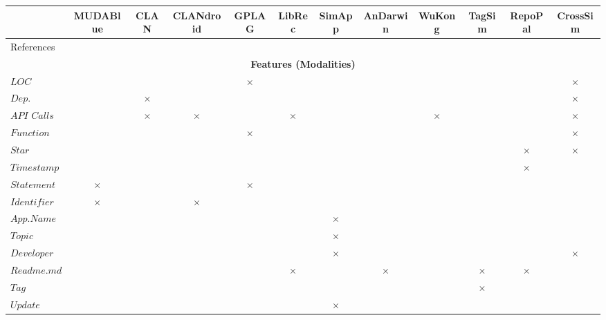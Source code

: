 \begin{landscape}
	\begin{table}[htbp]
		\footnotesize
		\centering
		\begin{tabular}{|p{2.5cm}|c|c|c|c|c|c|c|c|c|c|c|}  
			\hline 
			& \textbf{MUDABlue} & \textbf{CLAN} & \textbf{CLANdroid} & \textbf{GPLAG} & \textbf{LibRec} & \textbf{SimApp} & \textbf{AnDarwin} & \textbf{WuKong} & \textbf{TagSim} & \textbf{RepoPal} & \textbf{CrossSim} \\\hline			
			References & \cite{10.1109/APSEC.2004.69} & \cite{McMillan:2012:DSS:2337223.2337267} & \cite{10.1109ICPC.2016.7503721} & \cite{Liu:2006:GDS:1150402.1150522} & \cite{6671293} & \cite{Chen:2015:SFD:2684822.2685305} & \cite{Crussell2013} &  \cite{Wang:2015:WSA:2771783.2771795} & \cite{Lo:2012:DSA:2473496.2473616} & \cite{10.1109/SANER.2017.7884605} & \cite{NDRDSEAA2018} \\\hline
			\multicolumn{12}{|c|}{\bf Features (Modalities)}  \\ \cline{1-12}
			$LOC$ &  &  &  & $\times$ &  &  &  &  &  & &   $\times$ \\\hline
			$Dep.$ &  & $\times$ &  &  &  &  &  &  &  &  & $\times$ \\\hline
			$API$ $Calls$ &  & $\times$ & $\times$ &  & $\times$ &  &  & $\times$ &  & &  $\times$ \\\hline
			$Function$ &  &  &  & $\times$ &  &  &  &  &  &  &  $\times$ \\\hline
			$Star$ &  &  &  &  &  &  &  &   &  & $\times$ &  $\times$ \\\hline
			$Timestamp$ &  &  &  &  &  &  &  &  &   & $\times$  & \\\hline
			$Statement$ & $\times$ &  &  & $\times$ &  &  &  &  &  &   & \\\hline
			$Identifier$  & $\times$ &  & $\times$ &  &  &  &  &  &   &  & \\\hline
			$App. Name$ &  &  &  &  &  & $\times$ &  &  &  & & \\\hline
			$Topic$ &  &  &  &  &  & $\times$ &  &  &  &  & \\\hline
			$Developer$ &  &  &  &  &  & $\times$ &  &  &  &  &  $\times$ \\\hline
			$Readme.md$ &  &  &  &  & $\times$ &  & $\times$ &  & $\times$ & $\times$  & \\\hline
			$Tag$ &  &  &  &  &  &  &  &  & $\times$ &  & \\\hline
			$Update$ &  &  &  &  &  & $\times$ &  &  &   &  & \\\hline

\end{tabular}
\end{table}
\end{landscape}
